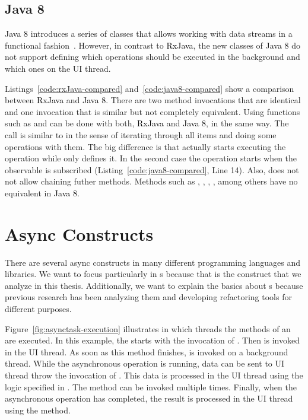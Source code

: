 \documentclass[type=bsc,accentcolor=tud9c]{tudthesis}
\newcommand{\framework}[1]{\textcolor{black}{#1}}
\begin{document}
\subsection{Java 8}
\framework{Java 8} introduces a series of classes that allows working with data streams in a functional fashion~\cite{bookJava8Streams}. However, in contrast to \framework{RxJava}, the new classes of \framework{Java 8} do not support defining which operations should be executed in the background and which ones on the UI thread.



Listings~\ref{code:rxJava-compared} and~\ref{code:java8-compared} show a comparison between \framework{RxJava} and \framework{Java 8}. There are two method invocations that are identical and one invocation that is similar but not completely equivalent. Using functions such as  and  can be done with both, \framework{RxJava} and \framework{Java 8}, in the same way. The call  is similar to  in the sense of iterating through all items and doing some operations with them. The big difference is that  actually starts executing the operation while  only defines it. In the second case the operation starts when the observable is subscribed (Listing~\ref{code:java8-compared}, Line 14). Also,  does not not allow chaining futher methods. Methods such as , , , , among others have no equivalent in \framework{Java 8}.

\section{Async Constructs}
There are several async constructs in many different programming languages and libraries. We want to focus particularly in s because that is the construct that we analyze in this thesis. Additionally, we want to explain the basics about s because previous research has been analyzing them and developing refactoring tools for different purposes.

Figure~\ref{fig:asynctask-execution} illustrates in which threads the methods of an  are executed. In this example, the  starts with the invocation of . Then  is invoked in the UI thread. As soon as this method finishes,  is invoked on a background thread. While the asynchronous operation is running, data can be sent to UI thread throw the invocation of . This data is processed in the UI thread using the logic specified in . The  method can be invoked multiple times. Finally, when the asynchronous operation has completed, the result is processed in the UI thread using the  method.
\end{document}
